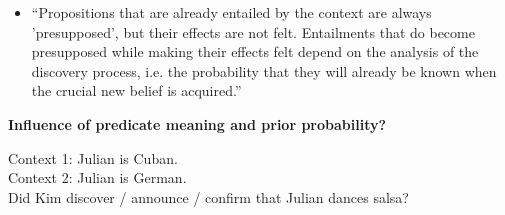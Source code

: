 \documentclass[11pt,fleqn]{article}
\newcommand{\6}{\mbox{$[\hspace*{-.6mm}[$}}
\newcommand{\9}{\mbox{$]\hspace*{-.6mm}]$}}
\begin{document}
\begin{itemize}
\begin{itemize}
\begin{exe}
 \end{exe}
 
 \item ``Propositions that are already entailed by the context are always 'presupposed', but their effects are not felt. Entailments that do become presupposed while making their effects felt depend on the analysis of the discovery process, i.e. the probability that they will already be known when the crucial new belief is acquired.''

\end{itemize}

\end{itemize}

\noindent
{\bf Influence of predicate meaning and prior probability?}

\begin{exe}
\ex 
Context 1: Julian is Cuban. \\
Context 2: Julian is German. \\ 
Did Kim discover / announce / confirm that Julian dances salsa?
\end{exe}
\end{document}
